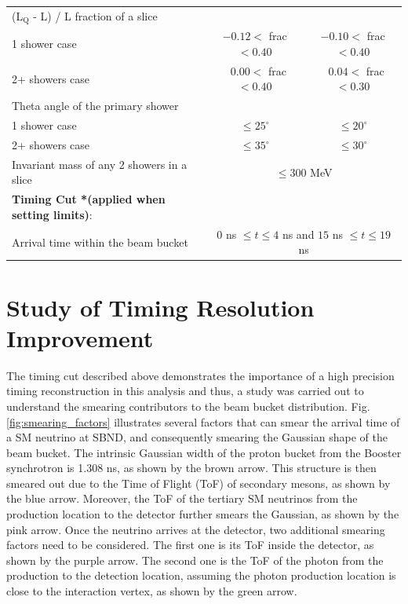 \begin{table}[htbp!]
\begin{center}
\begin{tabular}{| p{7.75cm} | m{3.25cm} | m{3.25cm} |}
 \cline{2-3}
 (L$_\mathrm{Q}$ - L) / L fraction of a slice &  &  \\
  \hspace{0.5cm} 1 shower case & \multicolumn{1}{c|}{$-0.12 <$ frac $< 0.40$} & \multicolumn{1}{c|}{$-0.10 <$ frac $< 0.40$} \\
  \hspace{0.5cm} 2+ showers case & \multicolumn{1}{c|}{$\ \ \ 0.00 <$ frac $< 0.40$} & \multicolumn{1}{c|}{$\ \ \ 0.04 <$ frac $< 0.30$} \\ [1ex]
  Theta angle of the primary shower &  &  \\
  \hspace{0.5cm}1 shower case & \multicolumn{1}{c|}{$\leq 25^\circ$} & \multicolumn{1}{c|}{$\leq20^\circ$} \\
  \hspace{0.5cm}2+ showers case & \multicolumn{1}{c|}{$\leq 35^\circ$} & \multicolumn{1}{c|}{$\leq 30^\circ$} \\ [1ex]
  \cline{2-3} 
  Invariant mass of any 2 showers in a slice  & \multicolumn{2}{c|}{$\leq 300$ MeV} \\ [1ex]
 \hline
 \textbf{Timing Cut *(applied when setting limits)}: &  \multicolumn{2}{c|}{} \\ [1ex] 
 Arrival time within the beam bucket  & \multicolumn{2}{c|}{$0$ ns $\leq t \leq 4$ ns and $15$ ns $\leq t \leq 19$ ns} \\ [1ex]
 \hline
\end{tabular}
\end{center}
\end{table}

\section{Study of Timing Resolution Improvement}
\label{sec:truth_bucket}

The timing cut described above demonstrates the importance of a high precision timing reconstruction in this analysis and thus, a study was carried out to understand the smearing contributors to the beam bucket distribution. 
Fig. \ref{fig:smearing_factors} illustrates several factors that can smear the arrival time of a SM neutrino at SBND, and consequently smearing the Gaussian shape of the beam bucket.
The intrinsic Gaussian width of the proton bucket from the Booster synchrotron is 1.308 ns, as shown by the brown arrow.
This structure is then smeared out due to the Time of Flight (ToF) of secondary mesons, as shown by the blue arrow.
Moreover, the ToF of the tertiary SM neutrinos from the production location to the detector further smears the Gaussian, as shown by the pink arrow.
Once the neutrino arrives at the detector, two additional smearing factors need to be considered.
The first one is its ToF inside the detector, as shown by the purple arrow.
The second one is the ToF of the photon from the production to the detection location, assuming the photon production location is close to the interaction vertex, as shown by the green arrow.

